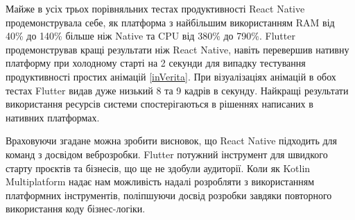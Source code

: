 Майже в усіх трьох порівняльних тестах продуктивності React Native продемонструвала себе, як платформа з найбільшим
використанням RAM від 40\% до 140\% більше ніж Native та CPU від 380\% до 790\%. Flutter продемонстрував кращі результати
ніж React Native, навіть перевершив нативну платформу при холодному старті на 2 секунди для випадку тестування
продуктивності простих анімацій \ref{inVerita}.
При візуалізаціях анімацій в обох тестах Flutter видав дуже низький 8 та 9 кадрів в секунду.
Найкращі результати використання ресурсів системи спостерігаються в рішеннях написаних в нативних платформах.

Враховуючи згадане можна зробити висновок, що React Native підходить для команд з досвідом веброзробки.
Flutter потужний інструмент для швидкого старту проєктів та бізнесів, що ще не здобули аудиторії.
Коли як Kotlin Multiplatform надає нам можливість надалі розробляти з використанням платформних інструментів,
поліпшуючи досвід розробки завдяки повторного використання коду бізнес-логіки.
